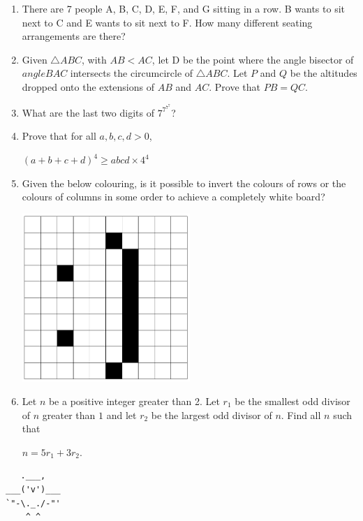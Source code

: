 \documentclass{article}
\begin{document}
\begin{enumerate}[1.]
\item %
There are 7 people A, B, C, D, E, F, and G sitting in a row. B wants to sit next to C and E wants to sit next to F. How many different seating arrangements are there?
\vspace{6.81mm}

\item %
Given $\triangle ABC$, with $AB < AC$, let D be the point where the angle bisector of $angle BAC$ intersects the circumcircle of $\triangle ABC$.
Let $P$ and $Q$ be the altitudes dropped onto the extensions of $AB$ and $AC$.
Prove that $PB = QC$.

\vspace{6.81mm}

\item %
What are the last two digits of $7^{7^{7^{7}}}$?
\vspace{6.81mm}

\item %
Prove that for all $a, b, c, d > 0$,
\begin{center}
	$(a + b + c + d)^{4} \geq abcd \times 4^{4}$
\end{center}

\item %
Given the below colouring, is it possible to invert the colours of rows or the colours of columns in some order to achieve a completely white board?
\begin{center}
	\includegraphics[width=0.5\textwidth]{test_5_q_1.png}
\end{center}

\vspace{6.81mm}

\item %
Let $n$ be a positive integer greater than 2. Let $r_1$ be the smallest odd divisor of $n$ greater than $1$ and let $r_2$ be the largest odd divisor of $n$. Find all $n$ such that
\begin{center}
	$n=5r_{1}+3r_{2}$.
\end{center}


\end{enumerate}


\vfill
\begin{center}
\begin{BVerbatim}
   .___,   
___('v')___
`"-\._./-"'
    ^ ^ 

\end{BVerbatim}
\end{center}
\end{document}
